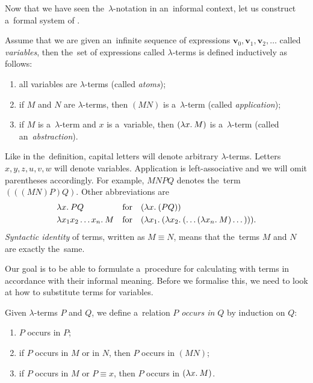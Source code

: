 Now that we have seen the~$\lambda$-notation in an~informal context, let us
construct a~formal system of \lc.
\begin{definition}\label{def:lambda_calculus}
  Assume that we are given an~infinite sequence of expressions $\mathbf{v}_0,
  \mathbf{v}_1, \mathbf{v}_2, \dots$ called \emph{variables}, then the~set of
  expressions called $\lambda$-terms is defined inductively as follows:
  \begin{enumerate}
    \item all variables are $\lambda$-terms (called \emph{atoms});
    \item if $M$ and $N$ are $\lambda$-terms, then $(M N)$ is a~$\lambda$-term
      (called \emph{application});
    \item if $M$ is a~$\lambda$-term and $x$ is a~variable, then $(\lambda x . \: M)$ is
      a~$\lambda$-term (called an~\emph{abstraction}).
  \end{enumerate}
\end{definition}
Like in the~definition, capital letters will denote arbitrary $\lambda$-terms.
Letters $x, y, z, u, v, w$ will denote variables. Application is
left-associative and we will omit parentheses accordingly. For example,
$M N P Q$ denotes the~term $(((M N) P) Q)$. Other abbreviations are
\begin{align*}
  &{\lambda x . \: P Q}  &  &\text{for}  &  &(\lambda x . \: (P Q)) \\
  &{\lambda x_1 x_2 \dots x_n . \: M}  &  &\text{for}  &
    &(\lambda x_1 . \: (\lambda x_2 . \: (\dots(\lambda x_n . \: M) \dots))).
\end{align*}
\emph{Syntactic identity} of terms, written as $M \equiv N$, means that
the~terms $M$ and $N$ are exactly the~same.


Our goal is to be able to formulate a~procedure for calculating with terms in
accordance with their informal meaning. Before we formalise this, we need to
look at how to substitute terms for variables.

\begin{definition}
  Given $\lambda$-terms $P$ and $Q$, we define a~relation \emph{$P$ occurs in
  $Q$} by induction on $Q$:
  \begin{enumerate}
    \item $P$ occurs in $P$;
    \item if $P$ occurs in $M$ or in $N$, then $P$ occurs in $(M N)$;
    \item if $P$ occurs in $M$ or $P \equiv x$, then $P$ occurs in $(\lambda x . \: M)$.
  \end{enumerate}
\end{definition}

